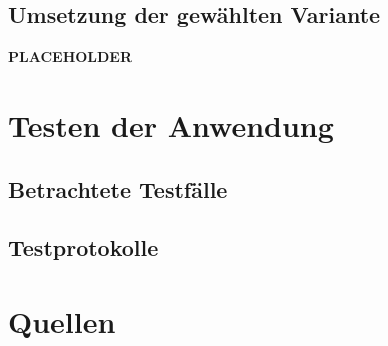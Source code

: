 \documentclass{article}
\begin{document}
\subsection{Umsetzung der gewählten Variante}

	\textbf{PLACEHOLDER}%

\newpage
\section{Testen der Anwendung}

\subsection{Betrachtete Testfälle}


\subsection{Testprotokolle}


\newpage
\section{Quellen}


\end{document}
